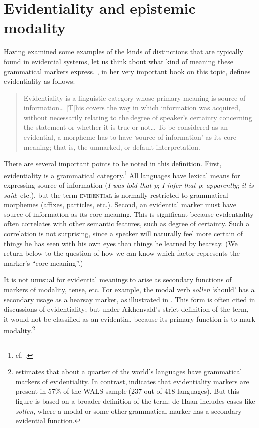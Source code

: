 \section{Evidentiality and epistemic modality}\label{sec:17.3}
\largerpage
Having examined some examples of the kinds of distinctions that are typically found in evidential systems, let us think about what kind of meaning these grammatical markers express. \citet[3]{Aikhenvald2004}, in her very important book on this topic, defines evidentiality as follows:


\begin{quote}
Evidentiality is a linguistic category whose primary meaning is source of information… [T]his covers the way in which information was acquired, without necessarily relating to the degree of speaker’s certainty concerning the statement or whether it is true or not… To be considered as an evidential, a morpheme has to have ‘source of information’ as its core meaning; that is, the unmarked, or default interpretation.
\end{quote}


There are several important points to be noted in this definition. First, evidentiality is a grammatical category.\footnote{cf. \citet[1]{Aikhenvald2004}.} All languages have lexical means for expressing source of information (\textit{I was told that p}; \textit{I infer that p}; \textit{apparently}; \textit{it is said}; etc.), but the term \textsc{evidential} is normally restricted to grammatical morphemes (affixes, particles, etc.). Second, an evidential marker must have source of information as its core meaning. This is significant because evidentiality often correlates with other semantic features, such as degree of certainty. Such a correlation is not surprising, since a speaker will naturally feel more certain of things he has seen with his own eyes than things he learned by hearsay. (We return below to the question of how we can know which factor represents the marker’s “core meaning”.)



It is not unusual for evidential meanings to arise as secondary functions of markers of modality, tense, etc. For example, the  modal verb \textit{sollen} ‘should’ has a secondary usage as a hearsay marker, as illustrated in . This form is often cited in discussions of evidentiality; but under Aikhenvald’s strict definition of the term, it would not be classified as an evidential, because its primary function is to mark modality.\footnote{\citet[1]{Aikhenvald2004} estimates that about a quarter of the world’s languages have grammatical markers of evidentiality. In contrast, \citet{deHaan2013} indicates that evidentiality markers are present in 57\% of the WALS sample (237 out of 418 languages). But this figure is based on a broader definition of the term: de Haan includes cases like  \textit{sollen}, where a modal or some other grammatical marker has a secondary evidential function.}


